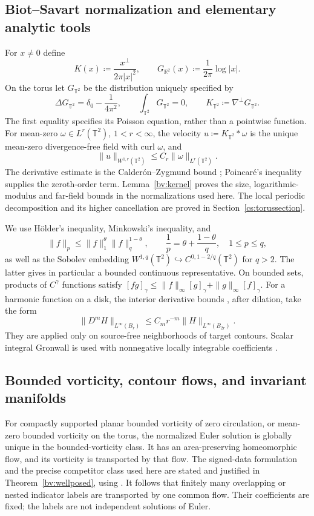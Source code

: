\documentclass[11pt]{amsart}
\theoremstyle{remark}
\numberwithin{equation}{section}
\newcommand{\R}{\mathbb R}
\newcommand{\T}{\mathbb T}
\begin{document}
\subsection{Biot--Savart normalization and elementary analytic tools}
For $x\ne0$ define
\[
 K(x)\coloneqq\frac{x^\perp}{2\pi|x|^2},\qquad
 G_{\R^2}(x)\coloneqq\frac1{2\pi}\log|x|.
\]
On the torus let $G_{\T^2}$ be the distribution uniquely specified by
\[
 \Delta G_{\T^2}=\delta_0-\frac1{4\pi^2},\qquad
 \int_{\T^2}G_{\T^2}=0,\qquad
 K_{\T^2}\coloneqq\nabla^\perp G_{\T^2}.
\]
The first equality specifies its Poisson equation, rather than a
pointwise function. For mean-zero $\omega\in L^r(\T^2)$,
$1<r<\infty$, the velocity $u\coloneqq K_{\T^2}*\omega$ is the unique
mean-zero divergence-free field with curl $\omega$, and
\[
 \|u\|_{W^{1,r}(\T^2)}\le C_r\|\omega\|_{L^r(\T^2)}.
\]
The derivative estimate is the Calder\'on--Zygmund bound
\cite{TaoCZ}; Poincar\'e's inequality supplies the zeroth-order term.
Lemma~\ref{bv:kernel} proves the size, logarithmic-modulus and
far-field bounds in the normalizations used here. The local periodic
decomposition and its higher cancellation are proved in
Section~\ref{cs:torussection}.

We use H\"older's inequality, Minkowski's inequality, and
\[
 \|f\|_p\le\|f\|_1^{\theta}\|f\|_q^{1-\theta},\qquad
 \frac1p=\theta+\frac{1-\theta}{q},\quad 1\le p\le q,
\]
as well as the Sobolev embedding $W^{1,q}(\T^2)\hookrightarrow
C^{0,1-2/q}(\T^2)$ for $q>2$. The latter gives in particular a
bounded continuous representative. On bounded sets, products of
$C^\gamma$ functions satisfy
$[fg]_\gamma\le\|f\|_\infty[g]_\gamma+
\|g\|_\infty[f]_\gamma$.
For a harmonic function on a disk, the interior derivative bounds
\cite[Theorem~2.4]{ABR}, after dilation, take the form
\[
 \|D^mH\|_{L^\infty(B_r)}\le C_m r^{-m}
                       \|H\|_{L^\infty(B_{2r})}.
\]
They are applied only on source-free neighborhoods of target contours.
Scalar integral Gronwall is used with nonnegative locally integrable
coefficients \cite[Lemma~2.7]{Teschl}.

\subsection{Bounded vorticity, contour flows, and invariant manifolds}
For compactly supported planar bounded vorticity of zero circulation,
or mean-zero bounded vorticity on the torus, the normalized Euler
solution is globally unique in the bounded-vorticity class. It has an
area-preserving homeomorphic flow, and its vorticity is transported by
that flow. The signed-data formulation and the precise competitor class
used here are stated and justified in Theorem~\ref{bv:wellposed}, using
\cite{Yudovich1963,CrippaStefani2024}. It follows that finitely many
overlapping or nested indicator labels are transported by one common
flow. Their coefficients are fixed; the labels are not independent
solutions of Euler.
\end{document}
